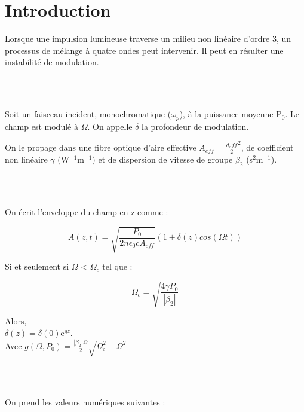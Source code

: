 \documentclass[a4paper,12pt,titlepage]{article}
\begin{document}
    
    \section{Introduction}
        Lorsque une impulsion lumineuse traverse un milieu non linéaire d'ordre 3, un processus de mélange à quatre ondes peut intervenir. Il peut en résulter une instabilité de modulation. 
        
        ~\\~
        
        Soit un faisceau incident, monochromatique ($\omega_{p}$), à la puissance moyenne P$_0$. Le champ est modulé à $\Omega$. On appelle $\delta$ la profondeur de modulation. 
        
        On le propage dans une fibre optique d'aire effective $A_{eff} = \frac{d_eff}{2}^2$, de coefficient non linéaire $\gamma$ (W$^{-1}$m$^{-1}$) et de dispersion de vitesse de groupe $\beta_2$ (s$^2$m$^{-1}$).
        
        ~\\~
        
        On écrit l'enveloppe du champ en z comme :
        
        \begin{equation}
        A(z,t) = \sqrt{\frac{P_{0}}{2n\epsilon_0cA_{eff}}}(1+\delta(z) cos(\Omega t))
        \end{equation}
        
        Si et seulement si $\Omega$ < $\Omega_c$ tel que : 
        
        \begin{equation*}
            \Omega_c = \sqrt{\frac{4\gamma P_0}{|\beta_2|}}
        \end{equation*}
        
        Alors, \\
        {\centering $\delta(z) = \delta(0) \text{e}^{gz}$.\\}
        Avec $g(\Omega,P_0) = \frac{|\beta_2|\Omega}{2}\sqrt{\Omega_c^2 - \Omega^2}$
        
        
        ~\\~
        
        On prend les valeurs numériques suivantes :
        
\end{document}
